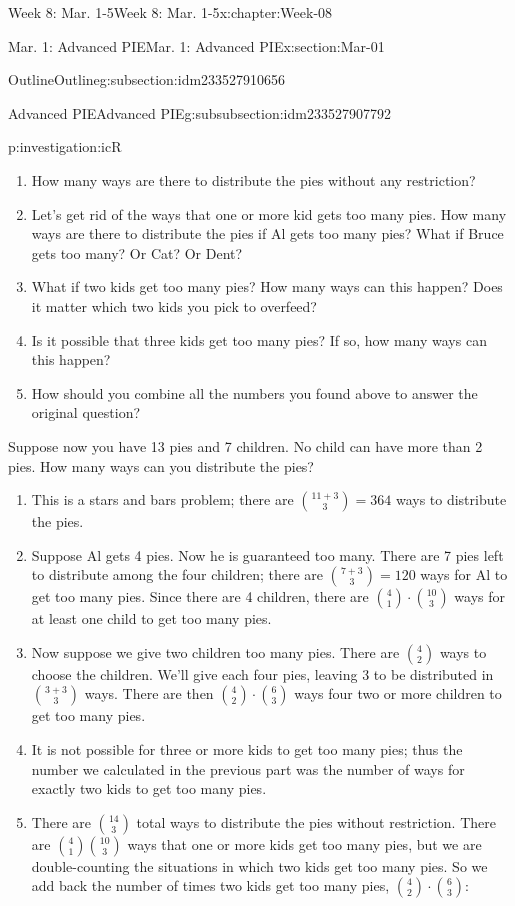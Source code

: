 \documentclass[oneside,10pt,]{book}
\numberwithin{equation}{section}
\begin{document}
\begin{chapterptx}{Week 8: Mar. 1-5}{}{Week 8: Mar. 1-5}{}{}{x:chapter:Week-08}
\begin{sectionptx}{Mar. 1: Advanced PIE}{}{Mar. 1: Advanced PIE}{}{}{x:section:Mar-01}
\begin{subsectionptx}{Outline}{}{Outline}{}{}{g:subsection:idm233527910656}
\begin{subsubsectionptx}{Advanced PIE}{}{Advanced PIE}{}{}{g:subsubsection:idm233527907792}
\begin{investigation}{}{p:investigation:icR}
\begin{enumerate}
\item{}How many ways are there to distribute the pies without any restriction?%
\item{}Let's get rid of the ways that one or more kid gets too many pies. How many ways are there to distribute the pies if Al gets too many pies? What if Bruce gets too many? Or Cat? Or Dent?%
\item{}What if two kids get too many pies? How many ways can this happen? Does it matter which two kids you pick to overfeed?%
\item{}Is it possible that three kids get too many pies? If so, how many ways can this happen?%
\item{}How should you combine all the numbers you found above to answer the original question?%
\end{enumerate}
%
\par
Suppose now you have 13 pies and 7 children. No child can have more than 2 pies. How many ways can you distribute the pies?%
\par\smallskip%
\noindent\hypertarget{g:solution:idm233527898192}{}%
\begin{enumerate}
\item{}This is a stars and bars problem; there are \(\binom{11+3}{3} = 364\) ways to distribute the pies.%
\item{}Suppose Al gets 4 pies. Now he is guaranteed too many. There are 7 pies left to distribute among the four children; there are \(\binom{7 + 3}{3} = 120\) ways for Al to get too many pies. Since there are 4 children, there are \(\binom{4}{1} \cdot \binom{10}{3}\) ways for at least one child to get too many pies.%
\item{}Now suppose we give two children too many pies. There are \(\binom{4}{2}\) ways to choose the children. We'll give each four pies, leaving 3 to be distributed in \(\binom{3+3}{3}\) ways. There are then \(\binom{4}{2}\cdot \binom{6}{3}\) ways four two or more children to get too many pies.%
\item{}It is not possible for three or more kids to get too many pies; thus the number we calculated in the previous part was the number of ways for exactly two kids to get too many pies.%
\item{}There are \(\binom{14}{3}\) total ways to distribute the pies without restriction. There are \(\binom{4}{1}\binom{10}{3}\) ways that one or more kids get too many pies, but we are double-counting the situations in which two kids get too many pies. So we add back the number of times two kids get too many pies, \(\binom{4}{2}\cdot \binom{6}{3}\):%

\end{enumerate}
\end{investigation}
\end{subsubsectionptx}
\end{subsectionptx}
\end{sectionptx}
\end{chapterptx}
\end{document}
